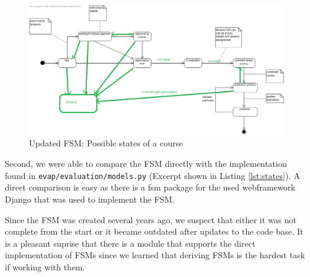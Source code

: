 \begin{figure}[h]
    \centering
    \includegraphics[width=\textwidth, keepaspectratio]{graphics/new_states_of_a_course}
    \caption{Updated FSM: Possible states of a course}
    \label{fig:new-states}
\end{figure}

Second, we were able to compare the FSM directly with the implementation found in \texttt{evap/evaluation/models.py} (Excerpt shown in Listing \ref{lst:states}).
A direct comparison is easy as there is a fsm package for the used webframework Django that was used to implement the FSM.



Since the FSM was created several years ago, we suspect that either it was not complete from the start or it became outdated after updates to the code base.  
It is a pleasant suprise that there is a module that supports the direct implementation of FSMs since we learned that deriving FSMs is the hardest task if working with them.
